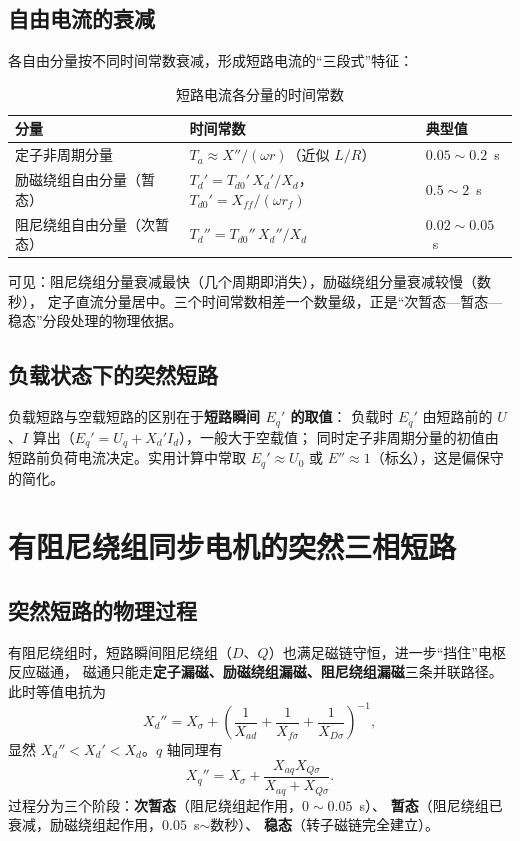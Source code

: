 \subsection{自由电流的衰减}

各自由分量按不同时间常数衰减，形成短路电流的“三段式”特征：

\begin{table}[htbp]
  \centering
  \caption{短路电流各分量的时间常数}
  \small
  \begin{tabular}{@{}lll@{}}
    \toprule
    分量 & 时间常数 & 典型值 \\
    \midrule
    定子非周期分量 & $T_a\approx X''/(\omega r)$（近似 $L/R$） & $0.05\sim0.2$~s \\
    励磁绕组自由分量（暂态） & $T_d'=T_{d0}'\,X_d'/X_d$，$T_{d0}'=X_{ff}/(\omega r_f)$ & $0.5\sim2$~s \\
    阻尼绕组自由分量（次暂态） & $T_d''=T_{d0}''\,X_d''/X_d$ & $0.02\sim0.05$~s \\
    \bottomrule
  \end{tabular}
\end{table}

可见：阻尼绕组分量衰减最快（几个周期即消失），励磁绕组分量衰减较慢（数秒），
定子直流分量居中。三个时间常数相差一个数量级，正是“次暂态—暂态—稳态”分段处理的物理依据。

\subsection{负载状态下的突然短路}

负载短路与空载短路的区别在于\textbf{短路瞬间 $E_q'$ 的取值}：
负载时 $E_q'$ 由短路前的 $U$、$I$ 算出（$E_q'=U_q+X_d'I_d$），一般大于空载值；
同时定子非周期分量的初值由短路前负荷电流决定。实用计算中常取
$E_q'\approx U_0$ 或 $E''\approx1$（标幺），这是偏保守的简化。

\section{有阻尼绕组同步电机的突然三相短路}

\subsection{突然短路的物理过程}

有阻尼绕组时，短路瞬间阻尼绕组（$D$、$Q$）也满足磁链守恒，进一步“挡住”电枢反应磁通，
磁通只能走\textbf{定子漏磁、励磁绕组漏磁、阻尼绕组漏磁}三条并联路径。此时等值电抗为
\begin{equation}
  X_d''=X_\sigma+\left(\frac{1}{X_{ad}}+\frac{1}{X_{f\sigma}}+\frac{1}{X_{D\sigma}}\right)^{-1},
\end{equation}
显然 $X_d''<X_d'<X_d$。$q$ 轴同理有
\begin{equation}
  X_q''=X_\sigma+\frac{X_{aq}X_{Q\sigma}}{X_{aq}+X_{Q\sigma}}.
\end{equation}
过程分为三个阶段：\textbf{次暂态}（阻尼绕组起作用，$0\sim0.05$~s）、
\textbf{暂态}（阻尼绕组已衰减，励磁绕组起作用，$0.05$~s$\sim$数秒）、
\textbf{稳态}（转子磁链完全建立）。

